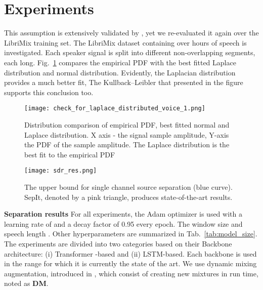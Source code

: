 \documentclass[a4paper]{article}
\theoremstyle{plain}
\theoremstyle{definition}
\theoremstyle{remark}
\begin{document}
\section{Experiments}
\label{sec:exp}


 This assumption is extensively validated by \cite{Jensen}, yet we re-evaluated it again over the LibriMix training set. The LibriMix dataset containing over  hours of speech is investigated. Each speaker signal is split into different non-overlapping segments, each  long. Fig.~\ref{fig:dist_compare} compares the empirical PDF with the best fitted Laplace distribution and normal distribution. Evidently, the Laplacian distribution provides a much better fit, The Kullback–Leibler that presented in the figure supports this conclusion too. 


\begin{figure}[h]
     \texttt{[image: check\_for\_laplace\_distributed\_voice\_1.png]}
    \caption{Distribution comparison of empirical PDF, best fitted normal and Laplace distribution. X axis - the signal sample amplitude, Y-axis the PDF of the sample amplitude. The Laplace distribution is the best fit to the empirical PDF}
    \label{fig:dist_compare}
\end{figure}





\begin{figure*}[t]
    \centering
     \texttt{[image: sdr\_res.png]}
    \caption{The upper bound for single channel source separation (blue curve).
SepIt, denoted by a pink triangle, produces state-of-the-art results.}
    \label{fig:sdr_res}
\end{figure*}














\noindent\textbf{Separation results\quad}
For all experiments, the Adam \cite{kingma2017adam} optimizer is used with a learning rate of  and a decay factor of 0.95 every epoch. The window size  and speech length . Other hyperparameters are summarized in Tab.~\ref{tab:model_size}.
The experiments are divided into two categories based on their Backbone architecture: (i) Transformer -based and (ii) LSTM-based. Each backbone is used in the range for which it is currently the state of the art.
We use dynamic mixing augmentation, introduced in \cite{zeghidour2020wavesplit}, which consist of creating new mixtures in run time, noted as \textbf{DM}.
\end{document}
